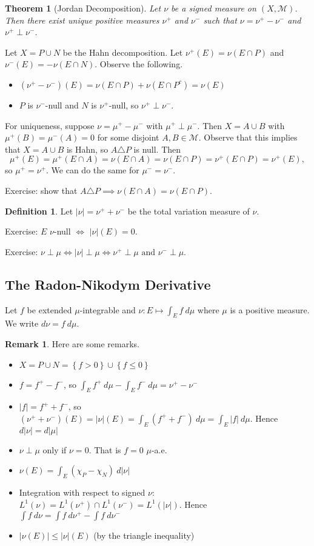\documentclass[11pt]{article}
\newtheorem{thm}{Theorem}[section]
\theoremstyle{definition}
\newtheorem{defn}{Definition}[section]
\newtheorem{remark}{Remark}[section]
\newcommand{\set}[1]{\left\{ #1 \right\}}
\newcommand{\abs}[1]{\left\lvert#1\right\rvert} %
\newcommand{\m}[1]{\mathcal{#1}}
\begin{document}
\begin{thm}[Jordan Decomposition]
  Let $\nu$ be a signed measure on $(X,\m{M})$. Then there exist unique positive measures
  $\nu^+$ and $\nu^-$ such that $\nu=\nu^+-\nu^-$ and $\nu^+\perp\nu^-$. 
\end{thm}
\proof
Let $X=P\cup N$ be the Hahn decomposition. Let $\nu^+(E)=\nu(E\cap P)$ and
$\nu^-(E)=-\nu(E\cap N)$. Observe the following. 
\begin{itemize}
  \item $(\nu^+-\nu^-)(E)=\nu(E\cap P)+\nu(E\cap P^c)=\nu(E)$ 
  \item $P$ is $\nu^-$-null and $N$ is $\nu^+$-null, so $\nu^+\perp\nu^-$. 
\end{itemize}
For uniqueness, suppose $\nu=\mu^+-\mu^-$ with $\mu^+\perp\mu^-$. Then $X=A\cup B$ with
$\mu^+(B)=\mu^-(A)=0$ for some disjoint $A,B\in\m{M}$. Observe that this implies that
$X=A\cup B$ is Hahn, so $A\triangle P$ is null. Then 
\[
  \mu^+(E)=\mu^+(E\cap A)=\nu(E\cap A)=\nu(E\cap P)=\nu^+(E\cap P)=\nu^+(E) ,
\]
so $\mu^+=\nu^+$. We can do the same for $\mu^-=\nu^-$. 

{\color{red}Exercise: show that $A\triangle P \implies \nu(E\cap A)=\nu(E\cap P)$.}
\qedhere

\begin{defn}
  Let $\abs{\nu}=\nu^++\nu^-$ be the total variation measure of $\nu$.  \end{defn}

{\color{red}
Exercise: $E$ $\nu$-null $\iff$ $\abs{\nu}(E)=0$. 

Exercise: $\nu\perp\mu \iff \abs{\nu}\perp\mu \iff \nu^+\perp\mu \text{ and }
\nu^-\perp\mu$. 
}

\subsection{The Radon-Nikodym Derivative}

Let $f$ be extended $\mu$-integrable and $\nu:E\mapsto\int_Ef~d\mu$ where $\mu$ is a
positive measure. We write $d\nu=f~d\mu$. 
\begin{remark} Here are some remarks. 
  \begin{itemize}
    \item $X = P\cup N = \set{f>0}\cup\set{f\le0}$ 
    \item $f=f^+-f^-$, so $\int_Ef^+~d\mu-\int_Ef^-~d\mu=\nu^+-\nu^-$
    \item $\abs{f}=f^++f^-$, so
    $(\nu^++\nu^-)(E)=\abs{\nu}(E)=\int_E(f^++f^-)~d\mu=\int_E\abs{f}~d\mu$. Hence
    $d\abs{\nu}=d\abs{\mu}$
    \item $\nu\perp\mu$ only if $\nu=0$. That is $f=0$ $\mu$-a.e.
    \item $\nu(E)=\int_E(\chi_P-\chi_N)~d\abs{\nu}$ 
    \item Integration with respect to signed $\nu$: $L^1(\nu)=L^1(\nu^+)\cap L^1(\nu^-) =
    L^1(\abs{\nu})$. Hence $\int f~d\nu = \int f~d\nu^+ - \int f~d\nu^-$
    \item $\abs{\nu(E)}\le\abs{\nu}(E)$ (by the triangle inequality)
  \end{itemize}
\end{remark}
\end{document}
